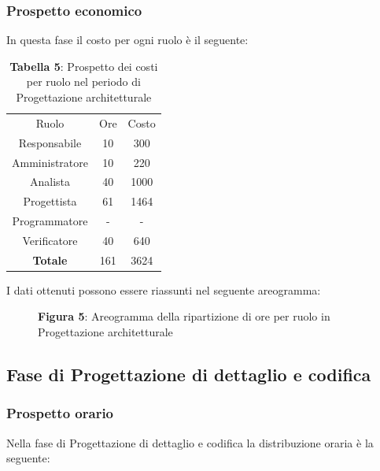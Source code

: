 \subsubsection{Prospetto economico}
In questa fase il costo per ogni ruolo è il seguente:

\begin{table}[H]
	\centering
	\renewcommand{\arraystretch}{1.5}
	\begin{tabular}{|c|c|c|}
		\hline
		\rowcolor{lighter-grayer}
		Ruolo & Ore & Costo \\
Responsabile   & 10  & 300  \\ \hline
Amministratore & 10  & 220  \\ \hline
Analista       & 40  & 1000 \\ \hline
Progettista    & 61  & 1464 \\ \hline
Programmatore  & - & - \\ \hline
Verificatore   & 40  & 640  \\ \hline
\textbf{Totale}& 161 & 3624 \\ \hline
	\end{tabular}
	\caption*{\textbf{Tabella 5}: Prospetto dei costi per ruolo nel periodo di Progettazione architetturale\\}
\end{table}

I dati ottenuti possono essere riassunti nel seguente areogramma:


\begin{figure}[H]
	\centering
	\caption*{\textbf{Figura 5}: Areogramma della ripartizione di ore per ruolo in Progettazione architetturale}
	\label{fig:Figura10}
\end{figure}



\subsection{Fase di Progettazione di dettaglio e codifica}
\subsubsection{Prospetto orario}
Nella fase di Progettazione di dettaglio e codifica la distribuzione oraria è la seguente:

